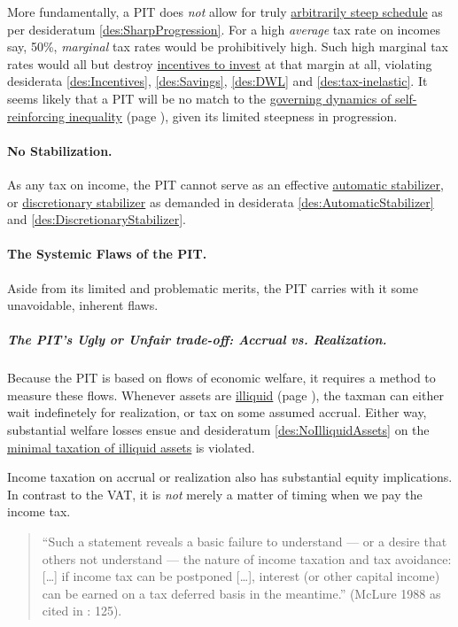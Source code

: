 More fundamentally, a PIT does \emph{not} allow for truly \hyperref[des:SharpProgression]{arbitrarily steep schedule} as per desideratum \ref{des:SharpProgression}. For a high \emph{average} tax rate on incomes say, 50\%, \emph{marginal} tax rates would be prohibitively high. Such high marginal tax rates would all but destroy \hyperref[des:Incentives]{incentives to invest} at that margin at all, violating desiderata \ref{des:Incentives}, \ref{des:Savings}, \ref{des:DWL} and \ref{des:tax-inelastic}. It seems likely that a PIT will be no match to the \hyperref[sec:GovDynofIneq]{governing dynamics of self-reinforcing inequality} (page \pageref{sec:GovDynofIneq}), given its limited steepness in progression.

\paragraph{No Stabilization.} As any tax on income, the PIT cannot serve as an effective \hyperref[des:AutomaticStabilizer]{automatic stabilizer}, or \hyperref[des:DiscretionaryStabilizer]{discretionary stabilizer} as demanded in desiderata \ref{des:AutomaticStabilizer} and \ref{des:DiscretionaryStabilizer}.

\paragraph{The Systemic Flaws of the PIT.} Aside from its limited and problematic merits, the PIT carries with it some unavoidable, inherent flaws.

\subparagraph{The PIT's Ugly or Unfair trade-off: Accrual vs. Realization.} Because the PIT is based on flows of economic welfare, it requires a method to measure these flows. Whenever assets are \hyperref[sec:Illiquid]{illiquid} (page \pageref{sec:Illiquid}), the taxman can either wait indefinetely for realization, or tax on some assumed accrual. Either way, substantial welfare losses ensue and desideratum \ref{des:NoIlliquidAssets} on the \hyperref[des:NoIlliquidAssets]{minimal taxation of illiquid assets} is violated.

Income taxation on accrual or realization also has substantial equity implications. In contrast to the VAT, it is \emph{not} merely a matter of timing when we pay the income tax. 

\begin{quote}
	``Such a statement reveals a basic failure to understand --- or a desire that others not understand --- the nature of income taxation and tax avoidance: [\ldots] if income tax can be postponed [\ldots], interest (or other capital income) can be earned on a tax deferred basis in the meantime.'' (McLure 1988 as cited in \citealt{Seidman1997}: 125).
\end{quote}

